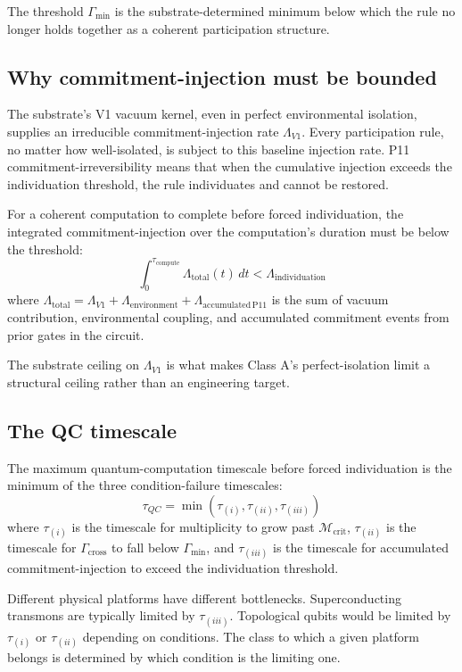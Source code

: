 \documentclass[11pt,a4paper]{article}
\begin{document}
The threshold $\Gamma_{\min}$ is the substrate-determined minimum below which the rule no longer holds together as a coherent participation structure.

\subsection{Why commitment-injection must be bounded}

The substrate's V1 vacuum kernel, even in perfect environmental isolation, supplies an irreducible commitment-injection rate $\Lambda_{V1}$. Every participation rule, no matter how well-isolated, is subject to this baseline injection rate. P11 commitment-irreversibility means that when the cumulative injection exceeds the individuation threshold, the rule individuates and cannot be restored.

For a coherent computation to complete before forced individuation, the integrated commitment-injection over the computation's duration must be below the threshold:
\[
\int_0^{\tau_{\mathrm{compute}}}\Lambda_{\mathrm{total}}(t)\, dt < \Lambda_{\mathrm{individuation}}
\]
where $\Lambda_{\mathrm{total}} = \Lambda_{V1} + \Lambda_{\mathrm{environment}} + \Lambda_{\mathrm{accumulated\,P11}}$ is the sum of vacuum contribution, environmental coupling, and accumulated commitment events from prior gates in the circuit.

The substrate ceiling on $\Lambda_{V1}$ is what makes Class A's perfect-isolation limit a structural ceiling rather than an engineering target.

\subsection{The QC timescale}

The maximum quantum-computation timescale before forced individuation is the minimum of the three condition-failure timescales:
\[
\tau_{QC} = \min(\tau_{(i)}, \tau_{(ii)}, \tau_{(iii)})
\]
where $\tau_{(i)}$ is the timescale for multiplicity to grow past $\mathcal{M}_{\mathrm{crit}}$, $\tau_{(ii)}$ is the timescale for $\Gamma_{\mathrm{cross}}$ to fall below $\Gamma_{\min}$, and $\tau_{(iii)}$ is the timescale for accumulated commitment-injection to exceed the individuation threshold.

Different physical platforms have different bottlenecks. Superconducting transmons are typically limited by $\tau_{(iii)}$. Topological qubits would be limited by $\tau_{(i)}$ or $\tau_{(ii)}$ depending on conditions. The class to which a given platform belongs is determined by which condition is the limiting one.
\end{document}
